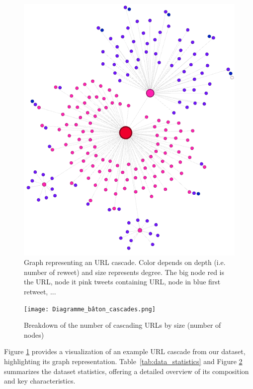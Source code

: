 \documentclass[sigconf,nonacm]{acmart}
\begin{document}
\begin{figure}
    \centering
    \includegraphics[scale=0.3]{graph_528_label_0_better_representation.png}
    \caption{Graph representing an URL cascade. Color depends on depth (i.e. number of reweet) and size represents degree. The big node red is the URL, node it pink tweets containing URL, node in blue first retweet, ...}
    \label{fig:url_cascade}
\end{figure}

\begin{figure}
    \centering
    \texttt{[image: Diagramme\_bâton\_cascades.png]}
    \caption{Breakdown of the number of cascading URLs by size (number of nodes)}
    \label{fig:graph_repartition}
\end{figure}

Figure \ref{fig:url_cascade} provides a visualization of an example URL cascade from our dataset, highlighting its graph representation. Table~\ref{tab:data_statistics} and Figure \ref{fig:graph_repartition} summarizes the dataset statistics, offering a detailed overview of its composition and key characteristics.
\end{document}
